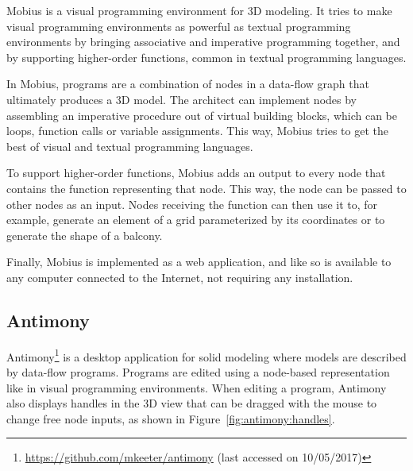 Mobius is a visual programming environment for 3D modeling.
It tries to make visual programming environments as powerful as textual programming environments by bringing associative and imperative programming together, and by supporting higher-order functions, common in textual programming languages\cite{Janssen2016}.

In Mobius, programs are a combination of nodes in a data-flow graph that ultimately produces a 3D model.
The architect can implement nodes by assembling an imperative procedure out of virtual building blocks, which can be loops, function calls or variable assignments.
This way, Mobius tries to get the best of visual and textual programming languages.

To support higher-order functions, Mobius adds an output to every node that contains the function representing that node.
This way, the node can be passed to other nodes as an input.
Nodes receiving the function can then use it to, for example, generate an element of a grid parameterized by its coordinates or to generate the shape of a balcony.

Finally, Mobius is implemented as a web application, and like so is available to any computer connected to the Internet, not requiring any installation.




\subsection{Antimony}

Antimony\footnote{\url{https://github.com/mkeeter/antimony} (last accessed on 10/05/2017)} is a desktop application for solid modeling where models are described by data-flow programs.
Programs are edited using a node-based representation like in visual programming environments.
When editing a program, Antimony also displays handles in the 3D view that can be dragged with the mouse to change free node inputs, as shown in Figure~\ref{fig:antimony:handles}.

